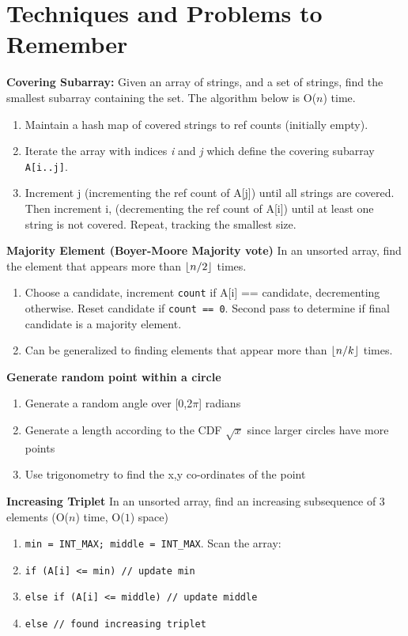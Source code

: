 \documentclass[12pt]{article}
\DeclarePairedDelimiter\floor{\lfloor}{\rfloor}
\newcommand{\OONE}{O($1$) }
\newcommand{\ON}{O($n$) }
\begin{document}
\section{Techniques and Problems to Remember}
\pagestyle{plain}

\noindent
\textbf{Covering Subarray:}
Given an array of strings, and a set of strings, find the smallest subarray containing the set.
The algorithm below is \ON time.
\begin{enumerate}
\item Maintain a hash map of covered strings to ref counts (initially empty). 
\item Iterate the array with indices \emph{i} and \emph{j} which define the covering subarray \texttt{A[i..j]}.
\item Increment j (incrementing the ref count of A[j]) until all strings are covered.
Then increment i, (decrementing the ref count of A[i]) until at least one string is not
covered. Repeat, tracking the smallest size. 
\end{enumerate}


\vspace{5mm}
\noindent
\textbf{Majority Element (Boyer-Moore Majority vote)}
In an unsorted array, find the element that appears more than $\floor*{n/2}$ times.
\begin{enumerate}
\item Choose a candidate, increment \texttt{count} if A[i] == candidate, decrementing otherwise. Reset candidate if \texttt{count == 0}. Second pass to determine if final
candidate is a majority element.
\item Can be generalized to finding elements that appear more than $\floor*{n/k}$ times.
\end{enumerate}

\vspace{5mm}
\noindent
\textbf{Generate random point within a circle}
\begin{enumerate}
\item Generate a random angle over [0,2$\pi$] radians
\item Generate a length according to the CDF $\sqrt{x}$ since larger circles have more points
\item Use trigonometry to find the x,y co-ordinates of the point
\end{enumerate}


\vspace{5mm}
\noindent
\textbf{Increasing Triplet}
In an unsorted array, find an increasing subsequence of 3 elements (\ON time, \OONE space)
\begin{enumerate}
\item \texttt{min = INT\_MAX; middle = INT\_MAX}. Scan the array:
\item \texttt{if (A[i] <= min) // update min}
\item \texttt{else if (A[i] <= middle) // update middle}
\item \texttt{else // found increasing triplet}
\end{enumerate}
\end{document}
